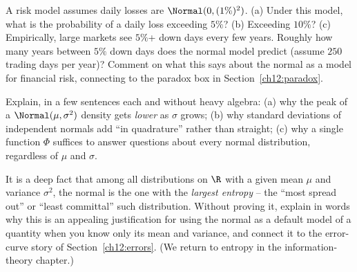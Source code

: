 \begin{exercise}
\label{ch12:exr-tails}
A risk model assumes daily losses are $\Normal(0, (1\%)^2)$. (a) Under this model,
what is the probability of a daily loss exceeding $5\%$? (b) Exceeding $10\%$?
(c) Empirically, large markets see $5\%$+ down days every few years. Roughly how
many years between $5\%$ down days does the normal model predict (assume $250$
trading days per year)? Comment on what this says about the normal as a model for
financial risk, connecting to the paradox box in Section~\ref{ch12:paradox}.
\end{exercise}

\begin{exercise}
\label{ch12:exr-concept}
Explain, in a few sentences each and without heavy algebra: (a) why the peak of a
$\Normal(\mu,\sigma^2)$ density gets \emph{lower} as $\sigma$ grows; (b) why
standard deviations of independent normals add ``in quadrature'' rather than
straight; (c) why a single function $\Phi$ suffices to answer questions about
every normal distribution, regardless of $\mu$ and $\sigma$.
\end{exercise}

\begin{exercise}
\label{ch12:exr-maxent}
It is a deep fact that among all distributions on $\R$ with a given mean $\mu$ and
variance $\sigma^2$, the normal is the one with the \emph{largest entropy} -- the
``most spread out'' or ``least committal'' such distribution. Without proving it,
explain in words why this is an appealing justification for using the normal as a
default model of a quantity when you know only its mean and variance, and connect
it to the error-curve story of Section~\ref{ch12:errors}. (We return to entropy in
the information-theory chapter.)
\end{exercise}
